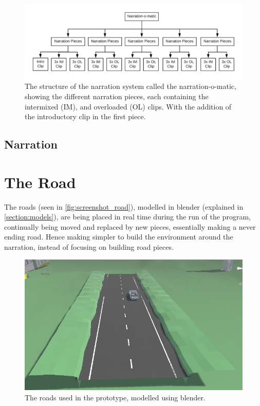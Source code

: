     \begin{figure}[H]
        \centering
        \includegraphics[width=0.9\linewidth]{figure/Implementation/Narration-o-matic-flowchart}
        \caption{The structure of the narration system called the narration-o-matic, showing the different narration pieces, each containing the intermixed (IM), and overloaded (OL) clips. With the addition of the introductory clip in the first piece.}
        \label{fig:narration-o-matic}
    \end{figure}
    
    \subsection{Narration}

\section{The Road}
    The roads (seen in \autoref{fig:screenshot_road}), modelled in blender (explained in \autoref{section:models}), are being placed in real time during the run of the program, continually being moved and replaced by new pieces, essentially making a never ending road. Hence making simpler to build the environment around the narration, instead of focusing on building road pieces.
    \begin{figure}[H]
        \centering
        \includegraphics[width=0.8\linewidth]{figure/Implementation/screenshots/road.png}
        \caption{The roads used in the prototype, modelled using blender.}
        \label{fig:screenshot_road}
    \end{figure}
    
